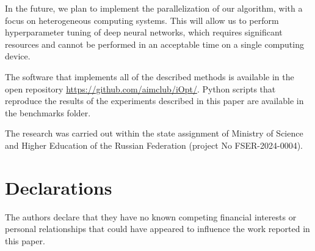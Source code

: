 \documentclass[iicol]{sn-jnl}
\theoremstyle{thmstyleone}%
\theoremstyle{thmstyletwo}%
\theoremstyle{thmstylethree}%
\begin{document}
In the future, we plan to implement the parallelization of our algorithm, with a focus on heterogeneous computing systems. This will allow us to perform hyperparameter tuning of deep neural networks, which requires significant resources and cannot be performed in an acceptable time on a single computing device. 

{}

The software that implements all of the described methods is available in the open repository \url{https://github.com/aimclub/iOpt/}.
Python scripts that reproduce the results of the experiments described in this paper are available in the benchmarks folder.


The research was carried out within the state assignment of Ministry of Science and Higher Education of the Russian Federation (project No FSER-2024-0004).



\section*{Declarations}

The authors declare that they have no known competing financial interests or personal relationships that could have appeared to influence the work reported in this paper.



\end{document}
